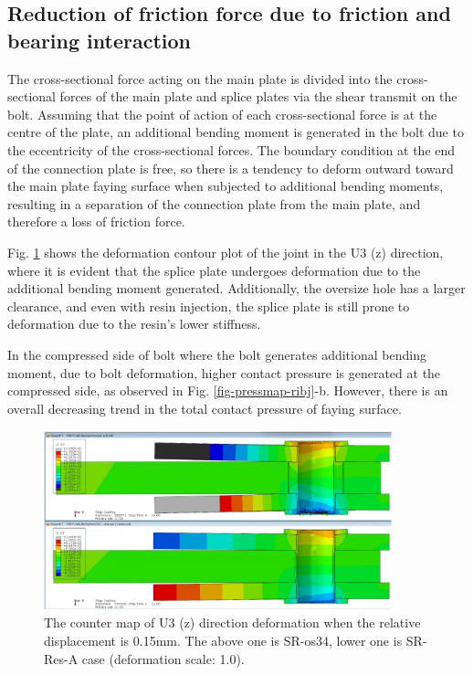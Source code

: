 \subsection{Reduction of friction force due to friction and bearing interaction}

The cross-sectional force acting on the main plate is divided into the cross-sectional forces of the main plate and splice plates via the shear transmit on the bolt. Assuming that the point of action of each cross-sectional force is at the centre of the plate, an additional bending moment is generated in the bolt due to the eccentricity of the cross-sectional forces. The boundary condition at the end of the connection plate is free, so there is a tendency to deform outward toward the main plate faying surface when subjected to additional bending moments, resulting in a separation of the connection plate from the main plate, and therefore a loss of friction force.

Fig. \ref{fig-u3cmap-ribj} shows the deformation contour plot of the joint in the U3 (z) direction, where it is evident that the splice plate undergoes deformation due to the additional bending moment generated. Additionally, the oversize hole has a larger clearance, and even with resin injection, the splice plate is still prone to deformation due to the resin's lower stiffness.

In the compressed side of bolt where the bolt generates additional bending moment, due to bolt deformation, higher contact pressure is generated at the compressed side, as observed in Fig. \ref{fig-pressmap-ribj}-b. However, there is an overall decreasing trend in the total contact pressure of faying surface.

\begin{figure}[htbp]
    \centering
    \includegraphics[width=0.9\textwidth]{imgs/app3/U3Cmap-RIBJ.png}
    \caption{ The counter map of U3 (z) direction deformation when the relative displacement is 0.15mm. The above one is SR-os34, lower one is SR-Res-A case (deformation scale: 1.0).}
    \label{fig-u3cmap-ribj}
\end{figure}


